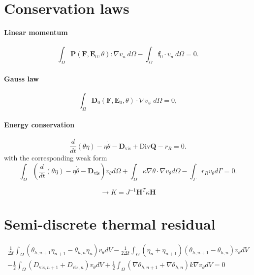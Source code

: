 \documentclass[a4paper,12pt]{article}
\newcommand{\D}{\mathbf{D}}
\newcommand{\E}{\mathbf{E}}
\newcommand{\F}{\mathbf{F}}
\renewcommand{\H}{\mathbf{H}}  %
\newcommand{\Q}{\mathbf{Q}}
\newcommand{\Div}{\text{Div}}
\newcommand{\0}{\mathbf{0}}
\begin{document}
\color{gray}

\section{Conservation laws}

\paragraph{Linear momentum}
\begin{equation*}
    \int_\Omega \mathbf{P}(\F, \E_0, \theta) : \nabla v_u \ d\Omega - \int_\Omega \mathbf{f}_0 \cdot v_u \ d\Omega = 0.
\end{equation*}

\paragraph{Gauss law}
\begin{equation*}
    \int_\Omega \D_0(\F, \E_0, \theta) \cdot \nabla v_\varphi \ d\Omega = 0,
\end{equation*}

\paragraph{Energy conservation}
\begin{equation*}
    \frac{d}{dt}(\theta\eta) - \eta\dot\theta - \D_\text{vis}
    + \Div\Q - r_R = 0.
\end{equation*}
with the corresponding weak form
\begin{equation*}
    \int_\Omega \left(\frac{d}{dt}(\theta\eta) -\eta\dot\theta -\D_\text{vis}\right)v_\theta d\Omega
    + \int_\Omega \kappa\nabla\theta\cdot\nabla v_\theta d\Omega
    - \int_\Gamma r_R v_\theta d\Gamma = 0.
\end{equation*}


\begin{equation*}
    \rightarrow K = J^{-1}\H^T\kappa\H
\end{equation*}



\section{Semi-discrete thermal residual}

\begin{multline*}
  \frac{1}{\Delta t}\int_\Omega (\theta_{h,n+1} \eta_{n+1} - \theta_{h,n} \eta_{n}) v_\theta dV
  -\frac{1}{2\Delta t}\int_\Omega (\eta_{n} + \eta_{n+1})(\theta_{h,n+1} - \theta_{h,n}) v_\theta dV \\
  -\frac{1}{2} \int_\Omega (D_{\text{vis},n+1} + D_{\text{vis},n}) v_\theta dV +
  \frac{1}{2} \int_\Omega (\nabla\theta_{h,n+1} + \nabla\theta_{h,n}) k \nabla v_\theta dV = 0
\end{multline*}
\end{document}
